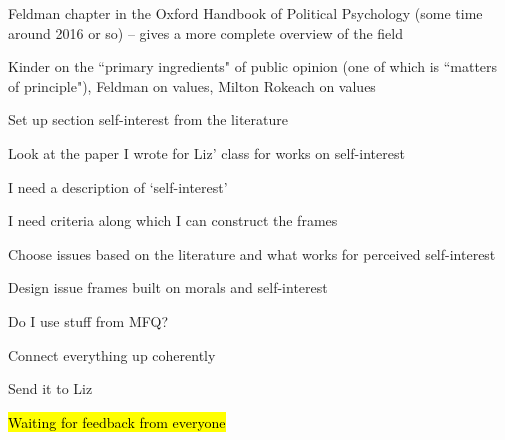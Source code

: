 \begin{coi}
\begin{coi}
				\item Feldman chapter in the Oxford Handbook of Political Psychology (some time around 2016 or so) -- gives a more complete overview of the field
				\item Kinder on the ``primary ingredients" of public opinion (one of which is ``matters of principle"), Feldman on values, Milton Rokeach on values
			\end{coi}
		\item Set up section self-interest from the literature
			\begin{coi}
				\item Look at the paper I wrote for Liz' class for works on self-interest
				\item I need a description of `self-interest'
				\item I need criteria along which I can construct the frames
			\end{coi}
		\item Choose issues based on the literature and what works for perceived self-interest
		\item Design issue frames built on morals and self-interest
			\begin{coi}
				\item Do I use stuff from MFQ?
			\end{coi}
		\item Connect everything up coherently
		\item Send it to Liz
		\item \hl{Waiting for feedback from everyone}
	\end{coi}
	
















